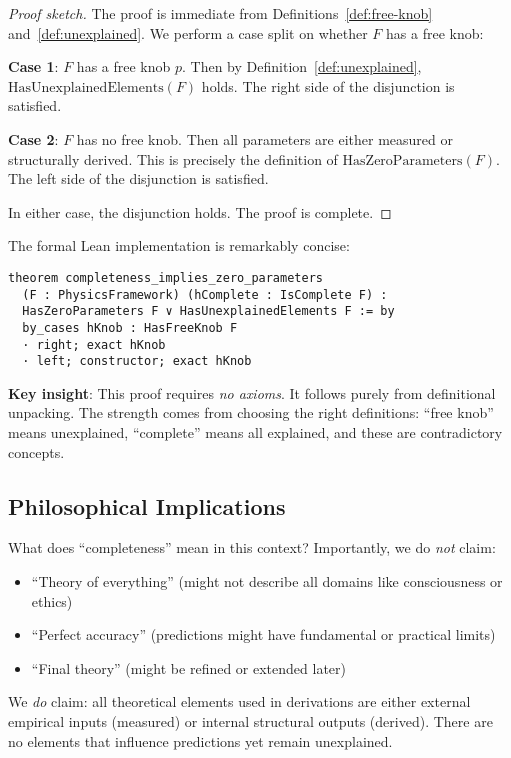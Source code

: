 \documentclass[12pt]{article}
\theoremstyle{remark}
\begin{document}
\begin{proof}[Proof sketch]
The proof is immediate from Definitions~\ref{def:free-knob} and~\ref{def:unexplained}. We perform a case split on whether $F$ has a free knob:

\textbf{Case 1}: $F$ has a free knob $p$. Then by Definition~\ref{def:unexplained}, $\mathrm{HasUnexplainedElements}(F)$ holds. The right side of the disjunction is satisfied.

\textbf{Case 2}: $F$ has no free knob. Then all parameters are either measured or structurally derived. This is precisely the definition of $\mathrm{HasZeroParameters}(F)$. The left side of the disjunction is satisfied.

In either case, the disjunction holds. The proof is complete.
\end{proof}

The formal Lean implementation is remarkably concise:
\begin{verbatim}
theorem completeness_implies_zero_parameters
  (F : PhysicsFramework) (hComplete : IsComplete F) :
  HasZeroParameters F ∨ HasUnexplainedElements F := by
  by_cases hKnob : HasFreeKnob F
  · right; exact hKnob
  · left; constructor; exact hKnob
\end{verbatim}

\textbf{Key insight}: This proof requires \emph{no axioms}. It follows purely from definitional unpacking. The strength comes from choosing the right definitions: ``free knob'' means unexplained, ``complete'' means all explained, and these are contradictory concepts.

\subsection{Philosophical Implications}

What does ``completeness'' mean in this context? Importantly, we do \emph{not} claim:
\begin{itemize}
\item ``Theory of everything'' (might not describe all domains like consciousness or ethics)
\item ``Perfect accuracy'' (predictions might have fundamental or practical limits)
\item ``Final theory'' (might be refined or extended later)
\end{itemize}

We \emph{do} claim: all theoretical elements used in derivations are either external empirical inputs (measured) or internal structural outputs (derived). There are no elements that influence predictions yet remain unexplained.
\end{document}
